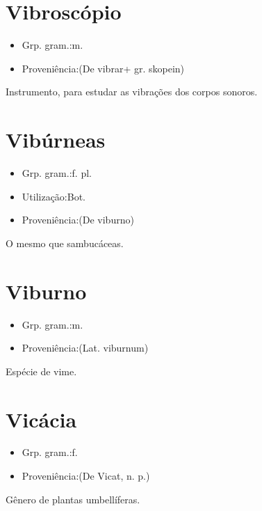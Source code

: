 \documentclass{article}
\begin{document}
\section{Vibroscópio}
\begin{itemize}
\item {Grp. gram.:m.}
\end{itemize}
\begin{itemize}
\item {Proveniência:(De \textunderscore vibrar\textunderscore  + gr. \textunderscore skopein\textunderscore )}
\end{itemize}
Instrumento, para estudar as vibrações dos corpos sonoros.
\section{Vibúrneas}
\begin{itemize}
\item {Grp. gram.:f. pl.}
\end{itemize}
\begin{itemize}
\item {Utilização:Bot.}
\end{itemize}
\begin{itemize}
\item {Proveniência:(De \textunderscore viburno\textunderscore )}
\end{itemize}
O mesmo que \textunderscore sambucáceas\textunderscore .
\section{Viburno}
\begin{itemize}
\item {Grp. gram.:m.}
\end{itemize}
\begin{itemize}
\item {Proveniência:(Lat. \textunderscore viburnum\textunderscore )}
\end{itemize}
Espécie de vime.
\section{Vicácia}
\begin{itemize}
\item {Grp. gram.:f.}
\end{itemize}
\begin{itemize}
\item {Proveniência:(De \textunderscore Vicat\textunderscore , n. p.)}
\end{itemize}
Gênero de plantas umbellíferas.
\end{document}
